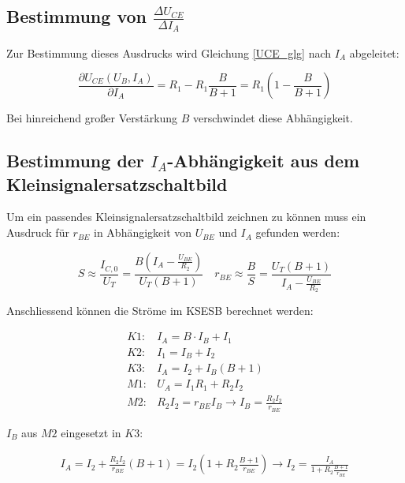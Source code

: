 \subsection{Bestimmung von $\frac{\Delta U_{CE}}{\Delta I_A}$}

Zur Bestimmung dieses Ausdrucks wird Gleichung \ref{UCE_glg} nach $I_A$ abgeleitet:

\begin{equation}
    \frac{\partial U_{CE}\left( U_B, I_A \right)}{\partial I_A} = 
    R_1 - R_1 \frac{B}{B+1} = R_1 \left( 1 - \frac{B}{B+1} \right) \label{dIA_simple}
\end{equation}

Bei hinreichend großer Verstärkung $B$ verschwindet diese Abhängigkeit.

\subsection{Bestimmung der $I_A$-Abhängigkeit aus dem Kleinsignalersatzschaltbild}

Um ein passendes Kleinsignalersatzschaltbild zeichnen zu können muss ein Ausdruck für $r_{BE}$ in Abhängigkeit von $U_{BE}$ und $I_{A}$ gefunden werden:

\begin{equation*}
    S \approx \frac{I_{C,0}}{U_T} = \frac{B \left(I_A - \frac{U_{BE}}{R_2}\right)}{U_T (B+1)}
    \quad 
    r_{BE} \approx \frac{B}{S} = \frac{U_T (B+1)}{I_A - \frac{U_{BE}}{R_2}}
\end{equation*}

Anschliessend können die Ströme im KSESB berechnet werden:

\begin{align*}
    K1:& I_A = B \cdot I_B + I_1 \\
    K2:& I_1 = I_B + I_2 \\
    K3:& I_A = I_2 + I_B (B+1)\\
    M1:& U_A = I_1 R_1 + R_2 I_2 \\
    M2:& R_2 I_2 = r_{BE} I_B \rightarrow I_B = \frac{R_2 I_2}{r_{BE}}
\end{align*}

$I_B$ aus $M2$ eingesetzt in $K3$:

\begin{align*}
    I_A = I_2 + \frac{R_2 I_2}{r_{BE}} (B+1) = I_2 \left( 1 + R_2\frac{B+1}{r_{BE}}\right) \rightarrow I_2 = \frac{I_A}{1 + R_2\frac{B+1}{r_{BE}}}
\end{align*}

